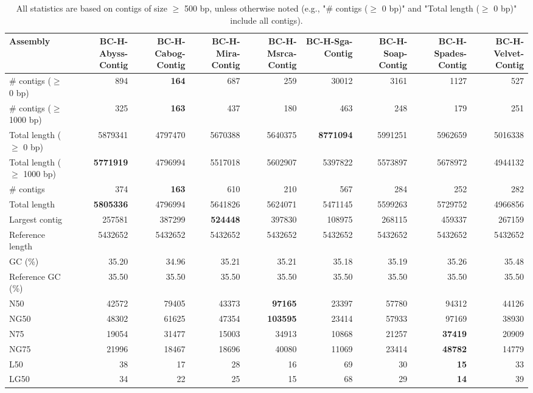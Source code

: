 \documentclass[12pt,a4paper]{article}
\begin{document}
\begin{table}[ht]
\begin{center}
\caption{All statistics are based on contigs of size $\geq$ 500 bp, unless otherwise noted (e.g., "\# contigs ($\geq$ 0 bp)" and "Total length ($\geq$ 0 bp)" include all contigs).}
\begin{tabular}{|l*{8}{|r}|}
\hline
Assembly & BC-H-Abyss-Contig & BC-H-Cabog-Contig & BC-H-Mira-Contig & BC-H-Msrca-Contig & BC-H-Sga-Contig & BC-H-Soap-Contig & BC-H-Spades-Contig & BC-H-Velvet-Contig \\ \hline
\# contigs ($\geq$ 0 bp) & 894 & {\bf 164} & 687 & 259 & 30012 & 3161 & 1127 & 527 \\ \hline
\# contigs ($\geq$ 1000 bp) & 325 & {\bf 163} & 437 & 180 & 463 & 248 & 179 & 251 \\ \hline
Total length ($\geq$ 0 bp) & 5879341 & 4797470 & 5670388 & 5640375 & {\bf 8771094} & 5991251 & 5962659 & 5016338 \\ \hline
Total length ($\geq$ 1000 bp) & {\bf 5771919} & 4796994 & 5517018 & 5602907 & 5397822 & 5573897 & 5678972 & 4944132 \\ \hline
\# contigs & 374 & {\bf 163} & 610 & 210 & 567 & 284 & 252 & 282 \\ \hline
Total length & {\bf 5805336} & 4796994 & 5641826 & 5624071 & 5471145 & 5599263 & 5729752 & 4966856 \\ \hline
Largest contig & 257581 & 387299 & {\bf 524448} & 397830 & 108975 & 268115 & 459337 & 267159 \\ \hline
Reference length & 5432652 & 5432652 & 5432652 & 5432652 & 5432652 & 5432652 & 5432652 & 5432652 \\ \hline
GC (\%) & 35.20 & 34.96 & 35.21 & 35.21 & 35.18 & 35.19 & 35.26 & 35.48 \\ \hline
Reference GC (\%) & 35.50 & 35.50 & 35.50 & 35.50 & 35.50 & 35.50 & 35.50 & 35.50 \\ \hline
N50 & 42572 & 79405 & 43373 & {\bf 97165} & 23397 & 57780 & 94312 & 44126 \\ \hline
NG50 & 48302 & 61625 & 47354 & {\bf 103595} & 23414 & 57933 & 97169 & 38930 \\ \hline
N75 & 19054 & 31477 & 15003 & 34913 & 10868 & 21257 & {\bf 37419} & 20909 \\ \hline
NG75 & 21996 & 18467 & 18696 & 40080 & 11069 & 23414 & {\bf 48782} & 14779 \\ \hline
L50 & 38 & 17 & 28 & 16 & 69 & 30 & {\bf 15} & 33 \\ \hline
LG50 & 34 & 22 & 25 & 15 & 68 & 29 & {\bf 14} & 39 \\ \hline

\end{tabular}
\end{center}
\end{table}
\end{document}
